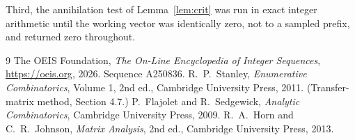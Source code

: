 \documentclass[11pt,a4paper]{article}
\theoremstyle{plain}
\theoremstyle{definition}
\begin{document}
Third, the annihilation test of Lemma~\ref{lem:crit} was run in exact integer arithmetic
until the working vector was identically zero, not to a sampled prefix, and returned zero
throughout.

\begin{thebibliography}{9}
 The OEIS Foundation, \emph{The On-Line Encyclopedia of Integer
Sequences}, \url{https://oeis.org}, 2026. Sequence A250836.
 R.~P.~Stanley, \emph{Enumerative Combinatorics}, Volume 1, 2nd ed.,
Cambridge University Press, 2011. (Transfer-matrix method, Section 4.7.)
 P.~Flajolet and R.~Sedgewick, \emph{Analytic Combinatorics}, Cambridge
University Press, 2009.
 R.~A.~Horn and C.~R.~Johnson, \emph{Matrix Analysis}, 2nd ed., Cambridge
University Press, 2013.
\end{thebibliography}
\end{document}
